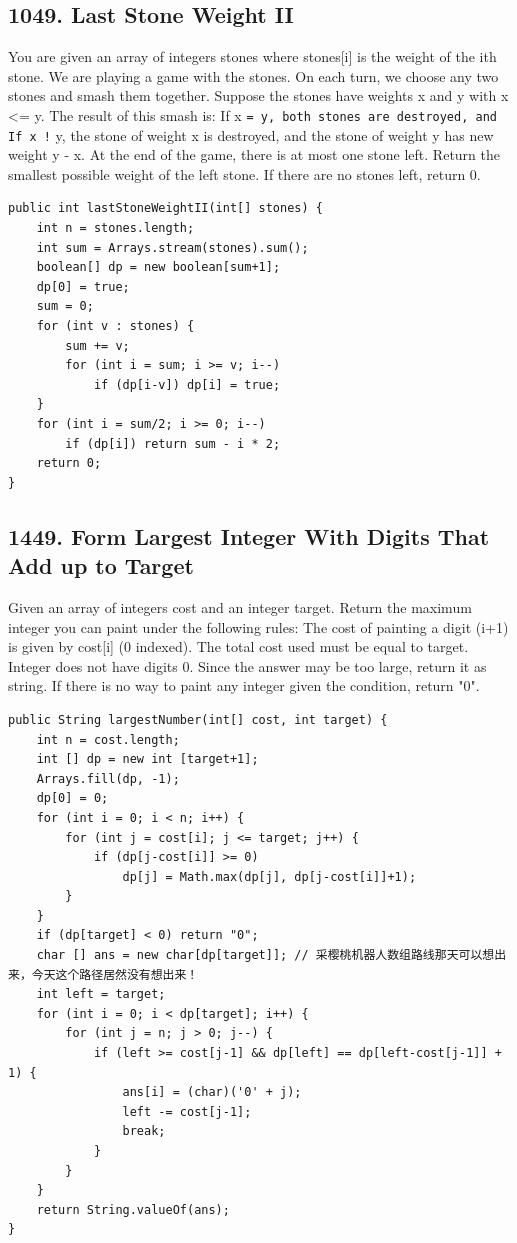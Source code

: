 \documentclass[9pt, b5paper]{article}
\begin{document}
\subsection{1049. Last Stone Weight II}
\label{sec-4-14}
You are given an array of integers stones where stones[i] is the weight of the ith stone.
We are playing a game with the stones. On each turn, we choose any two stones and smash them together. Suppose the stones have weights x and y with x <= y. The result of this smash is:
If x \texttt{= y, both stones are destroyed, and
If x !} y, the stone of weight x is destroyed, and the stone of weight y has new weight y - x.
At the end of the game, there is at most one stone left.
Return the smallest possible weight of the left stone. If there are no stones left, return 0.
\begin{verbatim}
public int lastStoneWeightII(int[] stones) {
    int n = stones.length;
    int sum = Arrays.stream(stones).sum();
    boolean[] dp = new boolean[sum+1];
    dp[0] = true;
    sum = 0;
    for (int v : stones) {
        sum += v;
        for (int i = sum; i >= v; i--) 
            if (dp[i-v]) dp[i] = true;
    }
    for (int i = sum/2; i >= 0; i--) 
        if (dp[i]) return sum - i * 2;
    return 0;
}
\end{verbatim}

\subsection{1449. Form Largest Integer With Digits That Add up to Target}
\label{sec-4-15}
Given an array of integers cost and an integer target. Return the maximum integer you can paint under the following rules:
The cost of painting a digit (i+1) is given by cost[i] (0 indexed).
The total cost used must be equal to target.
Integer does not have digits 0.
Since the answer may be too large, return it as string.
If there is no way to paint any integer given the condition, return "0".
\begin{verbatim}
public String largestNumber(int[] cost, int target) { 
    int n = cost.length;
    int [] dp = new int [target+1];
    Arrays.fill(dp, -1);
    dp[0] = 0;
    for (int i = 0; i < n; i++) {
        for (int j = cost[i]; j <= target; j++) {
            if (dp[j-cost[i]] >= 0)
                dp[j] = Math.max(dp[j], dp[j-cost[i]]+1);
        }
    }
    if (dp[target] < 0) return "0";
    char [] ans = new char[dp[target]]; // 采樱桃机器人数组路线那天可以想出来，今天这个路径居然没有想出来！
    int left = target;
    for (int i = 0; i < dp[target]; i++) {
        for (int j = n; j > 0; j--) {
            if (left >= cost[j-1] && dp[left] == dp[left-cost[j-1]] + 1) {
                ans[i] = (char)('0' + j);
                left -= cost[j-1];
                break;
            }
        }
    }
    return String.valueOf(ans);
}
\end{verbatim}
\end{document}
